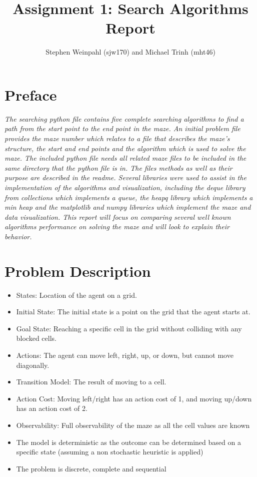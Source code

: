 \documentclass[a4paper]{article}
\title{Assignment 1: Search Algorithms Report}
\author{Stephen Weinpahl (sjw170) and Michael Trinh (mht46)}
\date{}
\begin{document}
\maketitle
\section*{{Preface}}

\textit
{The searching python file contains five complete searching algorithms to find a path from the start point to the end point in the maze. An initial problem file provides the maze number which relates to a file that describes the maze’s structure, the start and end points and the algorithm which is used to solve the maze. The included python file needs all related maze files to be included in the same directory that the python file is in. The files methods as well as their purpose are described in the readme. Several libraries were used to assist in the implementation of the algorithms and visualization, including the deque library from collections which implements a queue, the heapq library which implements a min heap and the matplotlib and numpy libraries which implement the maze and data visualization. This report will focus on comparing several well known algorithms performance on solving the maze and will look to explain their behavior. }
\newline
\newline
\section*{{Problem Description}}
\begin{itemize}
    \item States: Location of the agent on a grid.
    \item Initial State: The initial state is a point on the grid that the agent starts at.
    \item Goal State: Reaching a specific cell in the grid without colliding with any blocked cells.
    \item Actions: The agent can move left, right, up, or down, but cannot move diagonally.
    \item Transition Model: The result of moving to a cell.
    \item Action Cost: Moving left/right has an action cost of 1, and moving up/down has an action cost of 2.
    \item Observability: Full observability of the maze as all the cell values are known
    \item The model is deterministic as the outcome can be determined based on a specific state (assuming a non stochastic heuristic is applied)
    \item The problem is discrete, complete and sequential
\end{itemize}
\end{document}
